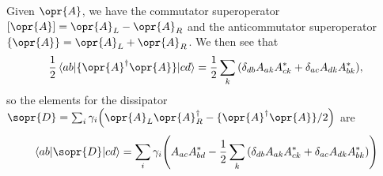 \documentclass[../thesis.tex]{subfiles}
\begin{document}
Given $\opr{A}$, we have the commutator superoperator $[\opr{A}] = \opr{A}_L -
\opr{A}_R$ and the anticommutator superoperator $\{\opr{A}\} = \opr{A}_L +
\opr{A}_R$. We then see that
\begin{equation}
  \frac{1}{2}\mel{ab}{\{\opr{A}^\dag \opr{A}\}}{cd}
  = \frac{1}{2}\sum_k\qty(\delta_{db} A_{ak}A_{ck}^* + \delta_{ac} A_{dk}A_{bk}^*),
\end{equation}
so the elements for the dissipator $\sopr{D} = \sum_i \gamma_i\qty(\opr{A}_L
\opr{A}_R^\dag - \{\opr{A}^\dag \opr{A}\}/2)$ are
\begin{equation}
  \mel{ab}{\sopr{D}}{cd}
  = \sum_i \gamma_i \qty(A_{ac}A_{bd}^* - \frac{1}{2}\sum_k\qty(\delta_{db} A_{ak}A_{ck}^* + \delta_{ac} A_{dk}A_{bk}^*))
\end{equation}


\end{document}
